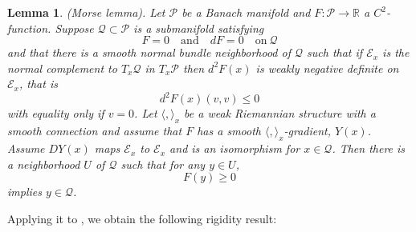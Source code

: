 \documentclass[12pt]{amsart}
\newtheorem{lemma}{Lemma}[section]
\numberwithin{equation}{section}
\begin{document}
\begin{lemma}
    (Morse lemma). Let $\mathcal{P}$ be a Banach manifold and $F:\mathcal{P}\rightarrow\mathbb{R}$ a $C^2$-function. Suppose $\mathcal{Q}\subset\mathcal{P}$ is a submanifold satisfying
    \begin{equation*}
        F=0\quad\mathrm{and}\quad dF=0\quad\mathrm{on}\ \mathcal{Q}
    \end{equation*}
    and that there is a smooth normal bundle neighborhood of $\mathcal{Q}$ such that if $\mathcal{E}_x$ is the normal complement to $T_x\mathcal{Q}$ in $T_x\mathcal{P}$ then $d^2F(x)$ is weakly negative definite on $\mathcal{E}_x$, that is 
    \begin{equation*}
        d^2F(x)(v,v)\leq0
    \end{equation*}
    with equality only if $v=0$. Let $\langle,\rangle_x$ be a weak Riemannian structure with a smooth connection and assume that $F$ has a smooth $\langle,\rangle_x$-gradient, $Y(x)$. Assume $DY(x)$ maps $\mathcal{E}_x$ to $\mathcal{E}_x$ and is an isomorphism for $x\in\mathcal{Q}$. Then there is a neighborhood $U$ of $\mathcal{Q}$ such that for any $y\in U$,
    \begin{equation*}
        F(y)\geq0
    \end{equation*}
    implies $y\in\mathcal{Q}$.
\end{lemma}

Applying it to , we obtain the following rigidity result:
\end{document}

